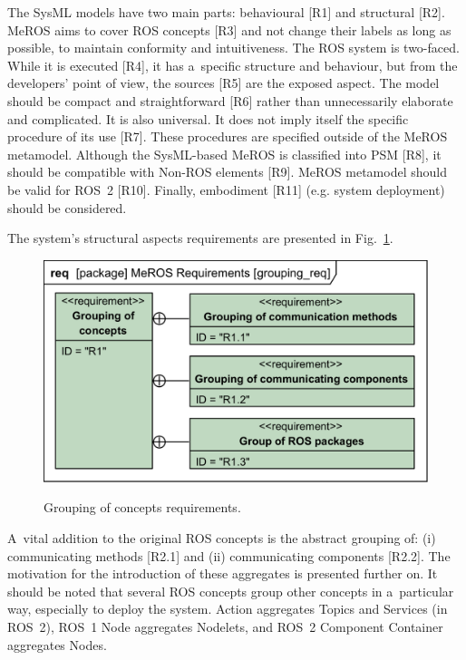 \documentclass[11pt,oneside,a4paper]{report}
\begin{document}
	The SysML models have two main parts: behavioural [R1] and structural [R2]. MeROS aims to cover ROS concepts [R3] and not change their labels as long as possible, to maintain conformity and intuitiveness. The ROS system is two-faced. While it is executed [R4], it has a~specific structure and behaviour, but from the developers' point of view, the sources [R5] are the exposed aspect. The model should be compact and straightforward [R6] rather than unnecessarily elaborate and complicated. It is also universal. It does not imply itself the specific procedure of its use [R7]. These procedures are specified outside of the MeROS metamodel. Although the SysML-based MeROS is classified into PSM [R8], it should be compatible with Non-ROS elements [R9]. MeROS metamodel should be valid for ROS~2 [R10]. Finally, embodiment [R11] (e.g. system deployment) should be considered.
	
	The system's structural aspects requirements are presented in Fig.~\ref{fig:grouping_req}.
	
	\begin{figure}[H]
		\centering
		\begin{center}
			{\includegraphics[scale=1.0]{diagrams/grouping_req.png}}
		\end{center}
		\caption{Grouping of concepts requirements.} 
		\label{fig:grouping_req}
	\end{figure}
	
	A~vital addition to the original ROS concepts is the abstract grouping of: (i) communicating methods [R2.1] and (ii) communicating components [R2.2]. The motivation for the introduction of these aggregates is presented further on. It should be noted that several ROS concepts group other concepts in a~particular way, especially to deploy the system. Action aggregates Topics and Services (in ROS~2), ROS~1 Node aggregates Nodelets, and ROS~2 Component Container aggregates Nodes.
		
\end{document}
